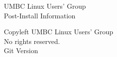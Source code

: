 \documentclass[11pt,notumble]{leaflet}
\begin{document}
\pagebreak

\begin{center} \Large
    UMBC Linux Users' Group \\
    Post-Install Information
\end{center}

\vfill
\begin{center} \small 
    \textcopyleft{} Copyleft \the\year{} UMBC Linux Users' Group \\
    No rights reserved. \\
    Git Version 
\end{center}
\end{document}

